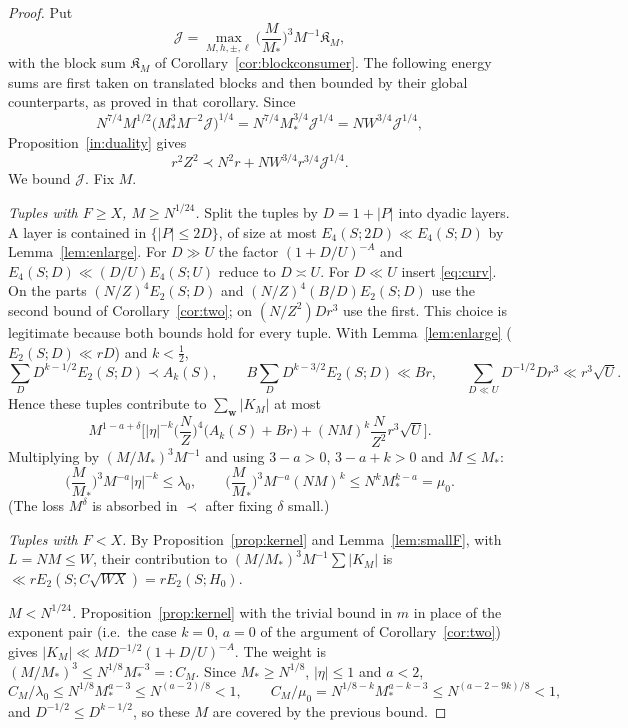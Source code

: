 \documentclass[11pt]{amsart}
\theoremstyle{definition}
\theoremstyle{remark}
\numberwithin{equation}{section}
\newcommand{\cJ}{\mathcal{J}}
\newcommand{\Mst}{M_{*}}
\begin{document}
\begin{proof}
Put
\[
\cJ=\max_{M,h,\pm,\ell}\Big(\frac M{\Mst}\Big)^{3}M^{-1}\mathfrak K_M,
\]
with the block sum $\mathfrak K_M$ of Corollary~\ref{cor:blockconsumer}. The following energy sums are first taken on translated blocks and then bounded by their global counterparts, as proved in that corollary. Since
\[
N^{7/4}M^{1/2}\big(\Mst^3M^{-2}\cJ\big)^{1/4}=N^{7/4}\Mst^{3/4}\cJ^{1/4}=NW^{3/4}\cJ^{1/4},
\]
Proposition~\ref{in:duality} gives
\begin{equation}\label{eq:rJ}
r^2Z^2\prec N^2r+NW^{3/4}r^{3/4}\cJ^{1/4}.
\end{equation}
We bound $\cJ$. Fix $M$.

\emph{Tuples with $F\ge X$, $M\ge N^{1/24}$.} Split the tuples by $D=1+|P|$ into dyadic layers. A layer is contained in $\{|P|\le 2D\}$, of size at most $E_4(S;2D)\ll E_4(S;D)$ by Lemma~\ref{lem:enlarge}. For $D\gg U$ the factor $(1+D/U)^{-A}$ and $E_4(S;D)\ll(D/U)E_4(S;U)$ reduce to $D\asymp U$. For $D\ll U$ insert \eqref{eq:curv}. On the parts $(N/Z)^4E_2(S;D)$ and $(N/Z)^4(B/D)E_2(S;D)$ use the second bound of Corollary~\ref{cor:two}; on $(N/Z^2)Dr^3$ use the first. This choice is legitimate because both bounds hold for every tuple. With Lemma~\ref{lem:enlarge} ($E_2(S;D)\ll rD$) and $k<\frac12$,
\[
\sum_D D^{k-1/2}E_2(S;D)\prec A_k(S),\qquad
B\sum_DD^{k-3/2}E_2(S;D)\ll Br,\qquad
\sum_{D\ll U}D^{-1/2}Dr^3\ll r^3\sqrt U .
\]
Hence these tuples contribute to $\sum_{\mathbf w}|K_M|$ at most
\[
M^{1-a+\delta}\Big[|\eta|^{-k}\Big(\frac NZ\Big)^4\big(A_k(S)+Br\big)+(NM)^k\frac N{Z^2}r^3\sqrt U\Big].
\]
Multiplying by $(M/\Mst)^3M^{-1}$ and using $3-a>0$, $3-a+k>0$ and $M\le\Mst$:
\[
\Big(\frac M\Mst\Big)^3M^{-a}|\eta|^{-k}\le\lambda_0,\qquad
\Big(\frac M\Mst\Big)^3M^{-a}(NM)^k\le N^k\Mst^{k-a}=\mu_0 .
\]
(The loss $M^\delta$ is absorbed in $\prec$ after fixing $\delta$ small.)

\emph{Tuples with $F<X$.} By Proposition~\ref{prop:kernel} and Lemma~\ref{lem:smallF}, with $L=NM\le W$, their contribution to $(M/\Mst)^3M^{-1}\sum|K_M|$ is $\ll rE_2(S;C\sqrt{WX})=rE_2(S;H_0)$.

\emph{$M<N^{1/24}$.} Proposition~\ref{prop:kernel} with the trivial bound in $m$ in place of the exponent pair (i.e.\ the case $k=0$, $a=0$ of the argument of Corollary~\ref{cor:two}) gives $|K_M|\ll MD^{-1/2}(1+D/U)^{-A}$. The weight is $(M/\Mst)^3\le N^{1/8}\Mst^{-3}=:C_M$. Since $\Mst\ge N^{1/8}$, $|\eta|\le1$ and $a<2$,
\[
C_M/\lambda_0\le N^{1/8}\Mst^{a-3}\le N^{(a-2)/8}<1,\qquad
C_M/\mu_0=N^{1/8-k}\Mst^{a-k-3}\le N^{(a-2-9k)/8}<1,
\]
and $D^{-1/2}\le D^{k-1/2}$, so these $M$ are covered by the previous bound.


\end{proof}
\end{document}
